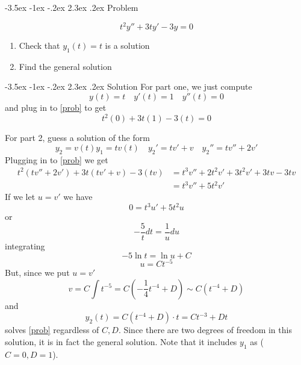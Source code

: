 \documentclass[11pt]{article}
\makeatletter
\renewcommand\section{\@startsection{section}{1}{\z@}%
                                  {-3.5ex \@plus -1ex \@minus -.2ex}%
                                  {2.3ex \@plus.2ex}%
                                  {\normalfont\large\bfseries}}
\makeatother
\begin{document}
\section{Problem}

\begin{equation}\label{prob}t^2 y'' + 3t y' - 3y = 0\end{equation}
\begin{enumerate}
\item Check that $y_1(t) = t$ is a solution
\item Find the general solution
\end{enumerate}

\section{Solution}
For part one, we just compute
\[y(t) = t \quad y'(t) =1 \quad y''(t) = 0\]
and plug in to \ref{prob} to get
\[t^2 (0) + 3t ( 1) - 3 (t) = 0\]

For part 2, guess a solution of the form
\[y_2 = v(t) y_1 = t v(t) \quad y_2' = t v' + v \quad y_2'' = t v'' + 2v'\]
Plugging in to \ref{prob} we get
\begin{align*}t^2( t v'' + 2v')  + 3t ( t v' + v) - 3 (t v) &= t^3v'' + 2 t^2 v' + 3t^2 v' + 3t v - 3tv \\ &= t^3 v'' + 5t^2 v'  \end{align*}
If we let $u = v' $ we have 
\[0= t^3 u' + 5 t^2 u\]
or
\[-\frac{5}{t} dt   = \frac{1}{u} du\]
integrating\
\[-5 \ln t = \ln u +C\]
\[u = C t^{-5}\]
But, since we put $u = v'$ 
\[v = C \int t^{-5} = C \left( -  \frac{1}{4} t^{-4} + D\right) \sim C (t ^{-4} +D )\]
and 
\[y_2(t) = C(t^{-4} + D ) \cdot t = Ct^{-3}+  Dt \]
solves \ref{prob} regardless of $C,D$. Since there are two degrees of freedom in this solution, it is in fact the general solution. Note that it includes $y_1$ as ($C=0, D=1$).
\end{document}
